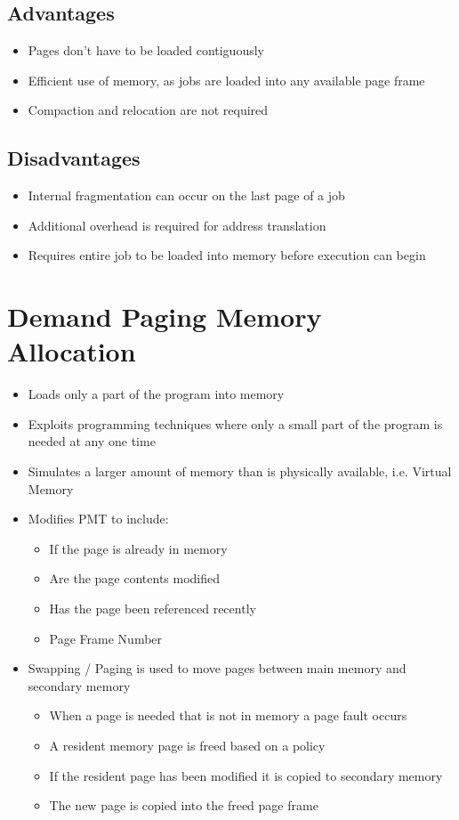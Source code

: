 \documentclass[12pt letter]{report}
\begin{document}
\subsection{Advantages}
\begin{itemize}
  \item Pages don't have to be loaded contiguously
  \item Efficient use of memory, as jobs are loaded into any available page frame
  \item Compaction and relocation are not required
\end{itemize}

\subsection{Disadvantages}
\begin{itemize}
  \item Internal fragmentation can occur on the last page of a job
  \item Additional overhead is required for address translation
  \item Requires entire job to be loaded into memory before execution can begin
\end{itemize}

\section{Demand Paging Memory Allocation}

\begin{itemize}
  \item Loads only a part of the program into memory
  \item Exploits programming techniques where only a small part of the program is needed at any one time
  \item Simulates a larger amount of memory than is physically available, i.e. Virtual Memory
  \item Modifies PMT to include:
        \begin{itemize}
          \item If the page is already in memory
          \item Are the page contents modified
          \item Has the page been referenced recently
          \item Page Frame Number
        \end{itemize}
  \item Swapping / Paging is used to move pages between main memory and secondary memory
        \begin{itemize}
          \item When a page is needed that is not in memory a page fault occurs
          \item A resident memory page is freed based on a policy
          \item If the resident page has been modified it is copied to secondary memory
          \item The new page is copied into the freed page frame
        \end{itemize}
\end{itemize}
\end{document}
